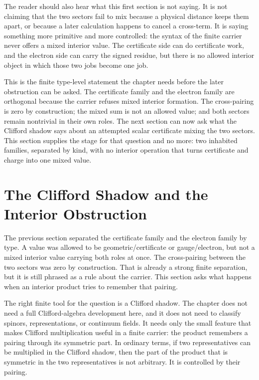 The reader should also hear what this first section is not saying. It is not
claiming that the two sectors fail to mix because a physical distance keeps
them apart, or because a later calculation happens to cancel a cross-term. It
is saying something more primitive and more controlled: the syntax of the
finite carrier never offers a mixed interior value. The certificate side can do
certificate work, and the electron side can carry the signed residue, but there
is no allowed interior object in which those two jobs become one job.

This is the finite type-level statement the chapter needs before the later
obstruction can be asked. The certificate family and the electron family are
orthogonal because the carrier refuses mixed interior formation. The
cross-pairing is zero by construction; the mixed sum is not an allowed value;
and both sectors remain nontrivial in their own roles. The next section can now
ask what the Clifford shadow says about an attempted scalar certificate mixing
the two sectors. This section supplies the stage for that question and no more:
two inhabited families, separated by kind, with no interior operation that
turns certificate and charge into one mixed value.

\section{The Clifford Shadow and the Interior Obstruction}

The previous section separated the certificate family and the electron family
by type. A value was allowed to be geometric/certificate or gauge/electron, but
not a mixed interior value carrying both roles at once. The cross-pairing
between the two sectors was zero by construction. That is already a strong
finite separation, but it is still phrased as a rule about the carrier. This
section asks what happens when an interior product tries to remember that
pairing.

The right finite tool for the question is a Clifford shadow. The chapter does
not need a full Clifford-algebra development here, and it does not need to
classify spinors, representations, or continuum fields. It needs only the
small feature that makes Clifford multiplication useful in a finite carrier:
the product remembers a pairing through its symmetric part. In ordinary terms,
if two representatives can be multiplied in the Clifford shadow, then the part
of the product that is symmetric in the two representatives is not arbitrary.
It is controlled by their pairing.

